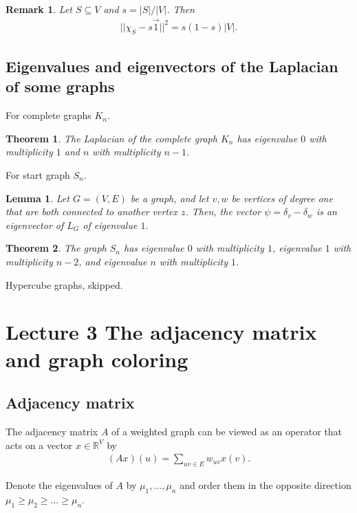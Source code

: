 \documentclass[]{article}
\newtheorem{theorem}{Theorem}[section]
\newtheorem{lemma}{Lemma}[section]
\newtheorem{remark}{Remark}[section]
\begin{document}
	\begin{remark}
		Let $S \subseteq V$ and $s = |S|/|V|$. Then 
		\begin{align*}
		||\chi_S - s \vec{1}||^2 = s(1-s)|V|.
		\end{align*}
	\end{remark}
	
	\subsection{Eigenvalues and eigenvectors of the Laplacian of some graphs}
	
	For complete graphs $K_n$. 
	
	\begin{theorem}
		The Laplacian of the complete graph $K_n$ has eigenvalue $0$ with multiplicity $1$ and $n$ with multiplicity $n-1$.
	\end{theorem}
	
	For start graph $S_n$. 
	
	\begin{lemma}
		Let $G=(V,E)$ be a graph, and let $v,w$ be vertices of degree one that are both connected to another vertex $z$. Then, the vector $\psi=\delta_v-\delta_w$ is an eigenvector of $L_G$ of eigenvalue $1$. 
	\end{lemma}
	
	\begin{theorem}
		The graph $S_n$ has eigenvalue $0$ with multiplicity $1$, eigenvalue $1$ with multiplicity $n-2$, and eigenvalue $n$ with multiplicity $1$. 
	\end{theorem}
	
	Hypercube graphs, skipped. 
	
	\section{Lecture 3 The adjacency matrix and graph coloring}
	
	\subsection{Adjacency matrix}
	The adjacency matrix $A$ of a weighted graph can be viewed as an operator that acts on a vector $x \in \mathbb{R}^V$ by 
	\begin{align*}
	(Ax)(u) = \sum_{uv\in E} w_{uv}x(v).
	\end{align*}
	
	Denote the eigenvalues of $A$ by $\mu_1, \dots, \mu_n$ and order them in the opposite direction $\mu_1 \ge \mu_2 \ge \dots \ge \mu_n$. 
	
\end{document}
